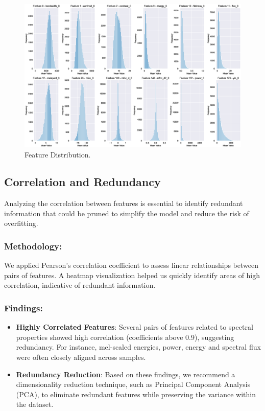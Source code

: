 \begin{figure}[!ht]
	\centering
	\includegraphics[scale=0.3]{fig/feature_dist}
	\vspace{-0.3cm}
	\caption{Feature Distribution.}
	\label{fig:FeatureDistribution}
	\vspace{-0.1cm}
\end{figure}


\subsection{Correlation and Redundancy}

Analyzing the correlation between features is essential to identify redundant information that could be pruned to simplify the model and reduce the risk of overfitting.

\subsubsection{Methodology:}

We applied Pearson's correlation coefficient to assess linear relationships between pairs of features. A heatmap visualization helped us quickly identify areas of high correlation, indicative of redundant information.

\subsubsection{Findings:}

\begin{itemize}
    \item \textbf{Highly Correlated Features}: Several pairs of features related to spectral properties showed high correlation (coefficients above 0.9), suggesting redundancy. For instance, mel-scaled energies, power, energy and spectral flux were often closely aligned across samples.
    \item \textbf{Redundancy Reduction}: Based on these findings, we recommend a dimensionality reduction technique, such as Principal Component Analysis (PCA), to eliminate redundant features while preserving the variance within the dataset.
\end{itemize}

